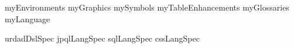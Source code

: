 \usepackage{todonotes}

\newif\ifslides
\slidesfalse

\usepackage{xcolor}

\usepackage{hyperref}

\usepackage{textcomp}

\usepackage{geometry}


{myEnvironments}
{myGraphics}
{mySymbols}
{myTableEnhancements}
{myGlossaries}
{myLanguage}

{urdadDslSpec}
{jpqlLangSpec}
{sqlLangSpec}
{cssLangSpec}

